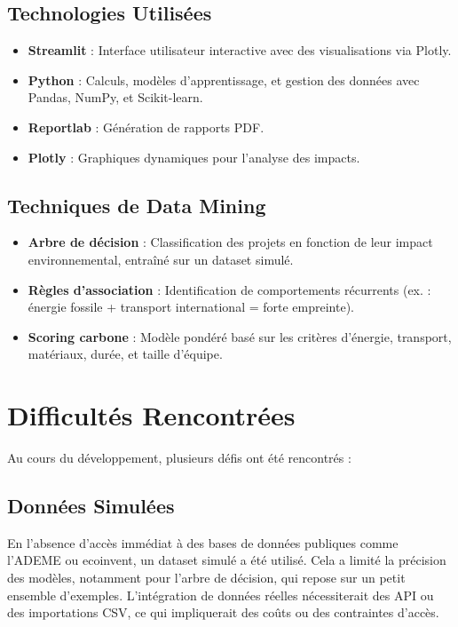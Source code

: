 \documentclass[a4paper,12pt]{article}
\begin{document}
\subsection{Technologies Utilisées}
\begin{itemize}
    \item \textbf{Streamlit} : Interface utilisateur interactive avec des visualisations via Plotly.
    \item \textbf{Python} : Calculs, modèles d'apprentissage, et gestion des données avec Pandas, NumPy, et Scikit-learn.
    \item \textbf{Reportlab} : Génération de rapports PDF.
    \item \textbf{Plotly} : Graphiques dynamiques pour l'analyse des impacts.
\end{itemize}

\subsection{Techniques de Data Mining}
\begin{itemize}
    \item \textbf{Arbre de décision} : Classification des projets en fonction de leur impact environnemental, entraîné sur un dataset simulé.
    \item \textbf{Règles d'association} : Identification de comportements récurrents (ex. : énergie fossile + transport international = forte empreinte).
    \item \textbf{Scoring carbone} : Modèle pondéré basé sur les critères d'énergie, transport, matériaux, durée, et taille d'équipe.
\end{itemize}

\section{Difficultés Rencontrées}
Au cours du développement, plusieurs défis ont été rencontrés :

\subsection{Données Simulées}
En l'absence d'accès immédiat à des bases de données publiques comme l'ADEME ou ecoinvent, un dataset simulé a été utilisé. Cela a limité la précision des modèles, notamment pour l'arbre de décision, qui repose sur un petit ensemble d'exemples. L'intégration de données réelles nécessiterait des API ou des importations CSV, ce qui impliquerait des coûts ou des contraintes d'accès.
\end{document}
